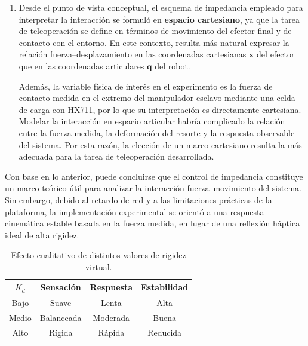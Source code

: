 \documentclass[journal,10pt,twoside]{IEEEtran}
\begin{document}
\begin{enumerate}[label=(\alph*)]
Este resultado indica que, bajo una interpretación estricta de
pasividad con $T_d=20$~ms, la rigidez virtual admisible para una
retroalimentación háptica ideal es muy reducida. En consecuencia,
una implementación agresiva de impedancia o de reflexión de fuerza
directa habría comprometido la estabilidad del sistema.

Por esta razón, en el presente proyecto no se implementó una
impedancia háptica rígida en el maestro. En su lugar, se adoptó una
estrategia práctica de retroalimentación basada en comportamiento,
en la que la fuerza medida por la celda de carga en el esclavo
provoca en el maestro una consecuencia observable, como detención,
reducción de avance o retirada, manteniendo así una interacción
estable y segura.

\item Desde el punto de vista conceptual, el esquema de impedancia
empleado para interpretar la interacción se formuló en
\textbf{espacio cartesiano}, ya que la tarea de teleoperación se
define en términos de movimiento del efector final y de contacto
con el entorno. En este contexto, resulta más natural expresar la
relación fuerza--desplazamiento en las coordenadas cartesianas
$\bm{x}$ del efector que en las coordenadas articulares
$\bm{q}$ del robot.

Además, la variable física de interés en el experimento es la fuerza
de contacto medida en el extremo del manipulador esclavo mediante una
celda de carga con HX711, por lo que su interpretación es
directamente cartesiana. Modelar la interacción en espacio
articular habría complicado la relación entre la fuerza medida, la
deformación del resorte y la respuesta observable del sistema.
Por esta razón, la elección de un marco cartesiano resulta la más
adecuada para la tarea de teleoperación desarrollada.

\end{enumerate}
\vspace{5mm}

Con base en lo anterior, puede concluirse que el control de
impedancia constituye un marco teórico útil para analizar la
interacción fuerza--movimiento del sistema. Sin embargo, debido al
retardo de red y a las limitaciones prácticas de la plataforma, la
implementación experimental se orientó a una respuesta cinemática
estable basada en la fuerza medida, en lugar de una reflexión
háptica ideal de alta rigidez.

\begin{table}[!t]
\centering
\caption{Efecto cualitativo de distintos valores de rigidez virtual.}
\label{tab:kd_compare}
\small
\begin{tabular}{cccc}
\toprule
\textbf{$K_d$} & \textbf{Sensación} & \textbf{Respuesta} & \textbf{Estabilidad} \\
\midrule
Bajo   & Suave   & Lenta  & Alta \\
Medio  & Balanceada & Moderada & Buena \\
Alto   & Rígida  & Rápida & Reducida \\
\bottomrule
\end{tabular}
\end{table}
\end{document}
